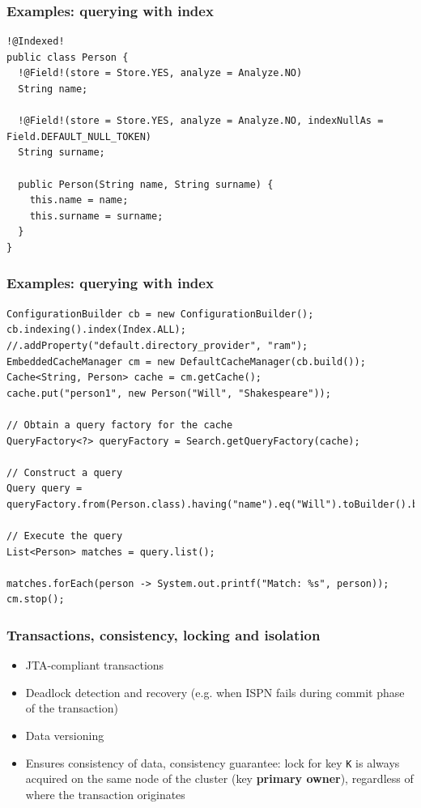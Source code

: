 \documentclass[10pt,utf8]{beamer}
\begin{document}
\begin{frame}[fragile]
	\frametitle{Examples: querying with index}
	\begin{lstlisting}[style=Java]
!@Indexed!
public class Person {
  !@Field!(store = Store.YES, analyze = Analyze.NO)
  String name;

  !@Field!(store = Store.YES, analyze = Analyze.NO, indexNullAs = Field.DEFAULT_NULL_TOKEN)
  String surname;

  public Person(String name, String surname) {
    this.name = name;
    this.surname = surname;
  }
}
	\end{lstlisting}
\end{frame}

\begin{frame}[fragile]
	\frametitle{Examples: querying with index}
	\begin{lstlisting}[style=Java]
ConfigurationBuilder cb = new ConfigurationBuilder();
cb.indexing().index(Index.ALL); //.addProperty("default.directory_provider", "ram");
EmbeddedCacheManager cm = new DefaultCacheManager(cb.build());
Cache<String, Person> cache = cm.getCache();
cache.put("person1", new Person("Will", "Shakespeare"));
      
// Obtain a query factory for the cache
QueryFactory<?> queryFactory = Search.getQueryFactory(cache);

// Construct a query
Query query = queryFactory.from(Person.class).having("name").eq("Will").toBuilder().build();
      
// Execute the query
List<Person> matches = query.list();

matches.forEach(person -> System.out.printf("Match: %s", person));
cm.stop();
	\end{lstlisting}
\end{frame}

\begin{frame}
	\frametitle{Transactions, consistency, locking and isolation}
	\begin{itemize}
		\item JTA-compliant transactions
		\pause
		\item Deadlock detection and recovery (e.g. when ISPN fails during commit phase of the transaction)
		\pause
		\item Data versioning
		\pause
		\item Ensures consistency of data, consistency guarantee: 
		lock for key \texttt{K} is always acquired on the same node of the cluster (key \textbf{primary owner}), regardless of where the transaction originates
	\end{itemize}
\end{frame}
\end{document}
